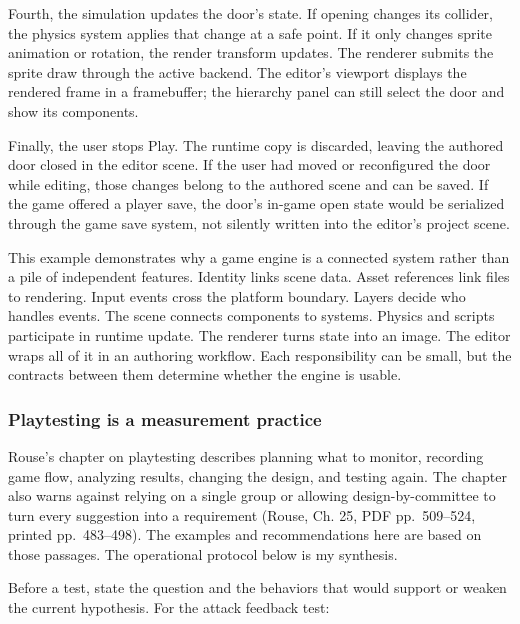 Fourth, the simulation updates the door's state. If opening changes its collider, the physics system applies that change at a safe point. If it only changes sprite animation or rotation, the render transform updates. The renderer submits the sprite draw through the active backend. The editor's viewport displays the rendered frame in a framebuffer; the hierarchy panel can still select the door and show its components.

Finally, the user stops Play. The runtime copy is discarded, leaving the authored door closed in the editor scene. If the user had moved or reconfigured the door while editing, those changes belong to the authored scene and can be saved. If the game offered a player save, the door's in-game open state would be serialized through the game save system, not silently written into the editor's project scene.

This example demonstrates why a game engine is a connected system rather than a pile of independent features. Identity links scene data. Asset references link files to rendering. Input events cross the platform boundary. Layers decide who handles events. The scene connects components to systems. Physics and scripts participate in runtime update. The renderer turns state into an image. The editor wraps all of it in an authoring workflow. Each responsibility can be small, but the contracts between them determine whether the engine is usable.

\subsubsection{Playtesting is a measurement practice}\label{playtesting-is-a-measurement-practice}

Rouse's chapter on playtesting describes planning what to monitor, recording game flow, analyzing results, changing the design, and testing again. The chapter also warns against relying on a single group or allowing design-by-committee to turn every suggestion into a requirement (Rouse, Ch. 25, PDF pp.~509--524, printed pp.~483--498). The examples and recommendations here are based on those passages. The operational protocol below is my synthesis.

Before a test, state the question and the behaviors that would support or weaken the current hypothesis. For the attack feedback test:

